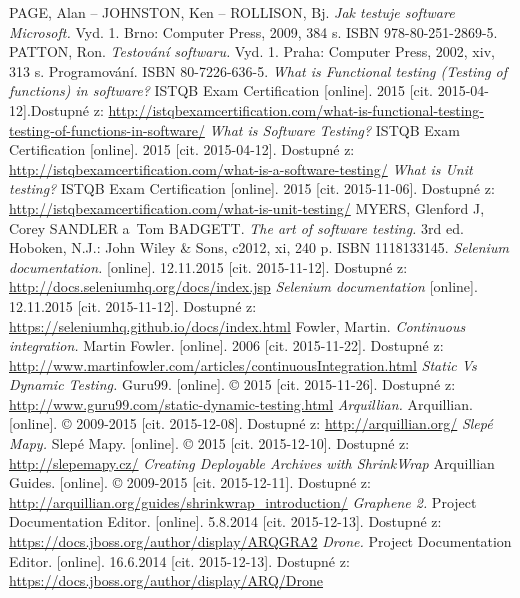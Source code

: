 \documentclass[
    color,   %
	table,   %
    twoside, %
    nolot, nolof,
]{fithesis3}
\begin{document}
\renewcommand{\refname}{Seznam literatury}
\begin{thebibliography}{9}
PAGE, Alan – JOHNSTON, Ken – ROLLISON, Bj. \emph{Jak testuje software Microsoft.} Vyd. 1. Brno: Computer Press, 2009, 384 s. ISBN 978-80-251-2869-5.
PATTON, Ron. \emph{Testování softwaru.} Vyd. 1. Praha: Computer Press, 2002, xiv, 313 s. Programování. ISBN 80-7226-636-5. 
\emph{What is Functional testing (Testing of functions) in software?} ISTQB Exam Certification [online]. 2015 [cit. 2015-04-12].Dostupné z: \url{http://istqbexamcertification.com/what-is-functional-testing-testing-of-functions-in-software/}
\emph{What is Software Testing?} ISTQB Exam Certification [online]. 2015 [cit. 2015-04-12]. Dostupné z: \url{http://istqbexamcertification.com/what-is-a-software-testing/}
\emph{What is Unit testing?} ISTQB Exam Certification [online]. 2015 [cit. 2015-11-06]. Dostupné z: \url{http://istqbexamcertification.com/what-is-unit-testing/}
MYERS, Glenford J, Corey SANDLER a~Tom BADGETT. \emph{The art of software testing.} 3rd ed. Hoboken, N.J.: John Wiley \& Sons, c2012, xi, 240 p. ISBN 1118133145.
\emph{Selenium documentation.} [online]. 12.11.2015 [cit. 2015-11-12]. Dostupné z: \url{http://docs.seleniumhq.org/docs/index.jsp}
\emph{Selenium documentation} [online]. 12.11.2015 [cit. 2015-11-12]. Dostupné z: \url{https://seleniumhq.github.io/docs/index.html}
Fowler, Martin. \emph{Continuous integration.} Martin Fowler. [online]. 2006 [cit. 2015-11-22]. Dostupné z: \url{http://www.martinfowler.com/articles/continuousIntegration.html}
\emph{Static Vs Dynamic Testing.} Guru99. [online]. © 2015 [cit. 2015-11-26]. Dostupné z: \url{http://www.guru99.com/static-dynamic-testing.html}
\emph{Arquillian.} Arquillian. [online]. © 2009-2015 [cit. 2015-12-08]. Dostupné z: \url{http://arquillian.org/}
\emph{Slepé Mapy.} Slepé Mapy. [online]. © 2015 [cit. 2015-12-10]. Dostupné z: \url{http://slepemapy.cz/}
\emph{Creating Deployable Archives with ShrinkWrap} Arquillian Guides. [online]. © 2009-2015 [cit. 2015-12-11]. Dostupné z: \url{http://arquillian.org/guides/shrinkwrap_introduction/}
\emph{Graphene 2.} Project Documentation Editor. [online]. 5.8.2014 [cit. 2015-12-13]. Dostupné z: \url{https://docs.jboss.org/author/display/ARQGRA2}
\emph{Drone.} Project Documentation Editor. [online]. 16.6.2014 [cit. 2015-12-13]. Dostupné z: \url{https://docs.jboss.org/author/display/ARQ/Drone}

\end{thebibliography}
\end{document}
